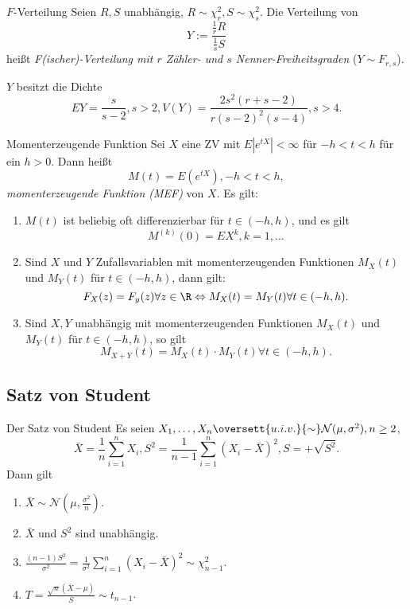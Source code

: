 \begin{karte}{\(F\)-Verteilung}
Seien \(R, S\) unabhängig, \(R \sim \chi_r^2, S \sim \chi_s^2\). Die Verteilung von 
\[ Y := \frac{\frac{1}{r} R}{\frac{1}{s} S} \]
heißt \textit{F(ischer)-Verteilung mit \(r\) Zähler- und \(s\) Nenner-Freiheitsgraden} (\(Y \sim F_{r,s}\)).

\(Y\) besitzt die Dichte 
\[ EY = \frac{s}{s-2}, s > 2, V(Y) = \frac{2s^2(r+s-2)}{r(s-2)^2(s-4)}, s > 4.\]
\end{karte}

\begin{karte}{Momenterzeugende Funktion}
Sei \(X\) eine ZV mit \(E|e^{tX}| < \infty\) für \(-h < t < h\) für ein \(h > 0\). 
Dann heißt 
\[ M(t) = E(e^{tX}), -h < t < h, \]
\textit{momenterzeugende Funktion (MEF)} von \(X\).
Es gilt: 
\begin{enumerate}
    \item \(M(t)\) ist beliebig oft differenzierbar für \(t \in (-h, h)\), und es gilt 
    \[ M^{(k)}(0) = E X^k, k = 1,\ldots \]
    \item Sind \(X\) und \(Y\) Zufallsvariablen mit momenterzeugenden Funktionen \(M_X(t)\) 
    und \(M_Y(t)\) für \(t \in (-h,h)\), dann gilt: 
    \[ F_X(z) = F_y(z) \forall z\in \R \Leftrightarrow M_X(t) = M_Y(t) \forall t\in (-h, h). \]
    \item Sind \(X,Y\) unabhängig mit momenterzeugenden Funktionen \(M_X(t)\) und \(M_Y(t)\) für \(t\in (-h,h)\),
    so gilt 
    \[ M_{X+Y}(t) = M_X(t) \cdot M_Y(t) \forall t\in (-h,h). \]
\end{enumerate}
\end{karte}

\subsection{Satz von Student}

\begin{karte}{Der Satz von Student}
Es seien \(X_1, \ldots, X_n \oversett{u.i.v.}{\sim} \mathcal{N}(\mu, \sigma^2), n \geq 2\),
\[ \bar{X} = \frac{1}{n} \sum_{i=1}^n X_i, S^2 = \frac{1}{n-1} \sum_{i=1}^n (X_i - \bar{X})^2, S = +\sqrt{S^2}. \]
Dann gilt 
\begin{enumerate}
    \item \(\bar{X} \sim \mathcal{N}(\mu, \frac{\sigma^2}{n})\).
    \item \(\bar{X}\) und \(S^2\) sind unabhängig.
    \item \(\frac{(n-1)S^2}{\sigma^2} = \frac{1}{\sigma^2} \sum_{i=1}^n (X_i - \bar{X})^2 \sim \chi_{n-1}^2. \)
    \item \(T = \frac{\sqrt{n}(\bar{X} - \mu)}{S} \sim t_{n-1}\).
\end{enumerate}
\end{karte}

